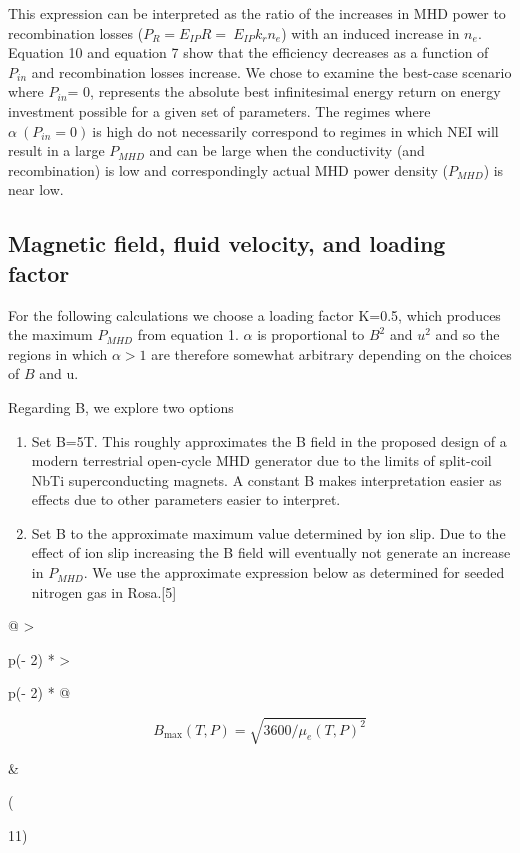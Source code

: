 This expression can be interpreted as the ratio of the increases in MHD power to recombination losses (\(P_{R} = E_{IP}R = \ E_{IP}k_{r}n_{e}\)) with an induced increase in \(n_{e}\). Equation 10 and equation 7 show that the efficiency decreases as a function of \(P_{in}\) and recombination losses increase. We chose to examine the best-case scenario where \(P_{in}\)= 0, represents the absolute best infinitesimal energy return on energy investment possible for a given set of parameters. The regimes where \(\alpha\ \left( P_{in} = 0 \right)\ \)is high do not necessarily correspond to regimes in which NEI will result in a large \(P_{MHD}\) and can be large when the conductivity (and recombination) is low and correspondingly actual MHD power density (\(P_{MHD}\)) is near low.

\hypertarget{magnetic-field-fluid-velocity-and-loading-factor}{%
\subsection{Magnetic field, fluid velocity, and loading factor}\label{magnetic-field-fluid-velocity-and-loading-factor}}

For the following calculations we choose a loading factor K=0.5, which produces the maximum \(P_{MHD}\) from equation 1. \(\alpha\) is proportional to \(B^{2}\) and \(u^{2}\) and so the regions in which \(\alpha > 1\) are therefore somewhat arbitrary depending on the choices of \(B\) and u.

Regarding B, we explore two options

\begin{enumerate}
\def\labelenumi{\arabic{enumi})}
\item
  Set B=5T. This roughly approximates the B field in the proposed design of a modern terrestrial open-cycle MHD generator due to the limits of split-coil NbTi superconducting magnets. A constant B makes interpretation easier as effects due to other parameters easier to interpret.
\item
  Set B to the approximate maximum value determined by ion slip. Due to the effect of ion slip increasing the B field will eventually not generate an increase in \(P_{MHD}\). We use the approximate expression below as determined for seeded nitrogen gas in Rosa.{[}5{]}
\end{enumerate}

\begin{longtable}[]{@{}
  >{\raggedright\arraybackslash}p{(\columnwidth - 2\tabcolsep) * }
  >{\raggedright\arraybackslash}p{(\columnwidth - 2\tabcolsep) * }@{}}
\toprule
\begin{minipage}[b]{\linewidth}\raggedright
\[B_{\max}(T,P) = \sqrt{3600/\mu_{e}(T,P)^{2}}\]
\end{minipage} & \begin{minipage}[b]{\linewidth}\raggedright
(

11)
\end{minipage} \\
\midrule
\endhead
\bottomrule
\end{longtable}

